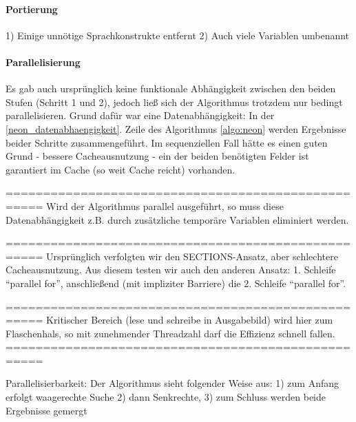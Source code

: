 \paragraph{Portierung}
\label{neon_portierung}
1) Einige unnötige Sprachkonstrukte entfernt
2) Auch viele Variablen umbenannt

\paragraph{Parallelisierung}
Es gab auch ursprünglich keine funktionale Abhängigkeit zwischen den beiden Stufen (Schritt 1 und 2),  jedoch ließ sich der Algorithmus trotzdem nur bedingt parallelisieren. Grund dafür war eine Datenabhängigkeit: In der \ref{neon_datenabhaengigkeit}. Zeile des Algorithmus \ref{algo:neon} werden Ergebnisse beider Schritte zusammengeführt. Im sequenziellen Fall hätte es einen guten Grund - bessere Cacheausnutzung - ein der beiden benötigten Felder ist garantiert im Cache (so weit Cache reicht) vorhanden.

===================================================
Wird der Algorithmus parallel ausgeführt, so muss diese Datenabhängigkeit z.B. durch zusätzliche temporäre Variablen eliminiert werden. 

===================================================
Ursprünglich verfolgten wir den SECTIONS-Ansatz, aber schlechtere Cacheausnutzung. Aus diesem testen wir auch den anderen Ansatz: 1. Schleife ``parallel for'', anschließend (mit impliziter Barriere) die 2. Schleife ``parallel for''.

===================================================
Kritischer Bereich (lese und schreibe in Ausgabebild) wird hier zum Flaschenhals, so mit zunehmender Threadzahl darf die Effizienz schnell fallen.
===================================================


Parallelisierbarkeit:
Der Algorithmus sieht folgender Weise aus:
	1) zum Anfang erfolgt waagerechte Suche 
	2) dann Senkrechte,
	3) zum Schluss werden beide Ergebnisse gemergt
	




